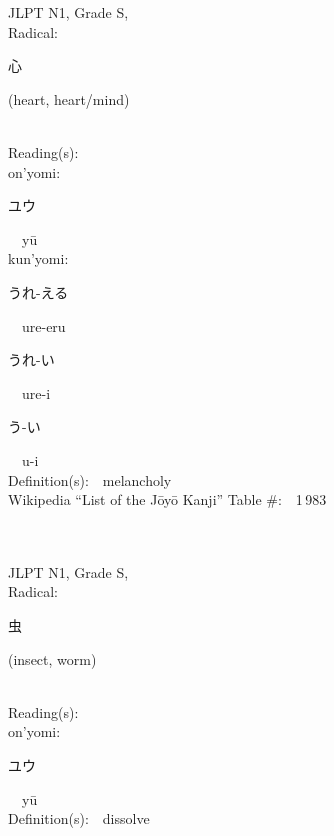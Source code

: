 \begin{multicols}{2}
{JLPT N1, Grade S, \\Radical:\ \ {\begin{CJK}{UTF8}{min} 心 \end{CJK}} (heart, heart/mind) } \\
Reading(s):\ \ \\
{\hspace*{1em}}on'yomi:\ \ \\
{\hspace*{2em}}{\begin{CJK}{UTF8}{min} ユウ \end{CJK}}\ \ y\=u\ \ \\
{\hspace*{1em}}kun'yomi:\ \ \\
{\hspace*{2em}}{\begin{CJK}{UTF8}{min} うれ-える \end{CJK}}\ \ ure-eru\ \ \\
{\hspace*{2em}}{\begin{CJK}{UTF8}{min} うれ-い \end{CJK}}\ \ ure-i\ \ \\
{\hspace*{2em}}{\begin{CJK}{UTF8}{min} う-い \end{CJK}}\ \ u-i\ \ \\
Definition(s):\ \ melancholy \\
Wikipedia ``List of the J\=oy\=o Kanji'' Table \#:\ \ 1\,983 \\
\ \ \\
{\fontsize{34pt}{40pt}  }\ \ \\
{JLPT N1, Grade S, \\Radical:\ \ {\begin{CJK}{UTF8}{min} 虫 \end{CJK}} (insect, worm) } \\
Reading(s):\ \ \\
{\hspace*{1em}}on'yomi:\ \ \\
{\hspace*{2em}}{\begin{CJK}{UTF8}{min} ユウ \end{CJK}}\ \ y\=u\ \ \\
Definition(s):\ \ dissolve \\

\end{multicols}
